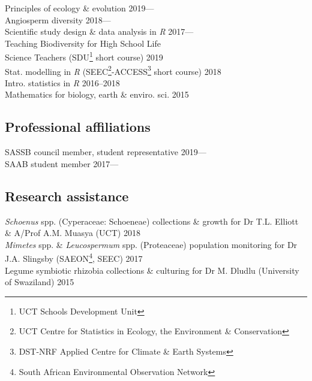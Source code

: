 \documentclass[10pt]{article}
\begin{document}
\begin{multicols}{2}
Principles of ecology \& evolution                             \hfill 2019--- \\
Angiosperm diversity                                           \hfill 2018--- \\
Scientific study design \& data analysis in \textit{R}         \hfill 2017--- \\
Teaching Biodiversity for High School Life \\
  \hspace{2em} Science Teachers {\footnotesize (SDU\footnote{UCT Schools 
  Development Unit} short course)}                                \hfill 2019 \\
Stat. modelling in \textit{R} {\footnotesize (SEEC\footnote{UCT Centre for 
  Statistics in Ecology, the Environment \& Conservation}-ACCESS\footnote{
  DST-NRF Applied Centre for Climate \& Earth Systems} short course)}
                                                                  \hfill 2018 \\
Intro. statistics in \textit{R}                             \hfill 2016--2018 \\
Mathematics for biology, earth \& enviro. sci.                       \hfill 2015

\subsection*{Professional affiliations} %

SASSB council member, student representative                   \hfill 2019--- \\
SAAB student member                                               \hfill 2017---

\end{multicols}

\subsection*{Research assistance} %

\textit{Schoenus} spp. (Cyperaceae: Schoeneae) collections \& growth for Dr
  T.L. Elliott \& A/Prof A.M. Muasya {\footnotesize (UCT)}        \hfill 2018 \\
\textit{Mimetes} spp. \& \textit{Leucospermum} spp. (Proteaceae) population 
  monitoring for Dr J.A. Slingsby {\footnotesize (SAEON\footnote{South African 
  Environmental Observation Network}, SEEC)}                      \hfill 2017 \\
Legume symbiotic rhizobia collections \& culturing for Dr M. Dludlu 
  {\footnotesize (University of Swaziland)}                          \hfill 2015
\end{document}

